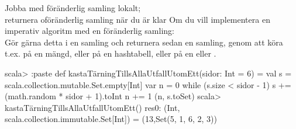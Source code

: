 \begin{Slide}{Jobba med föränderlig samling lokalt; \\ returnera oföränderlig samling när du är klar}
\SlideFontSmall
Om du vill implementera en imperativ algoritm med en föränderlig samling:\\ 
Gör gärna detta  i en  samling och returnera sedan en  samling, genom att köra t.ex.  på en mängd, eller  på en hashtabell, eller  på en  eller .

\begin{REPL}
scala> :paste
def kastaTärningTillsAllaUtfallUtomEtt(sidor: Int = 6) = {
  val s = scala.collection.mutable.Set.empty[Int]
  var n = 0
  while (s.size < sidor - 1) {
    s += (math.random * sidor + 1).toInt
    n += 1
  }
  (n, s.toSet)
}
scala> kastaTärningTillsAllaUtfallUtomEtt()
res0: (Int, scala.collection.immutable.Set[Int]) = (13,Set(5, 1, 6, 2, 3))

\end{REPL}

\end{Slide}





